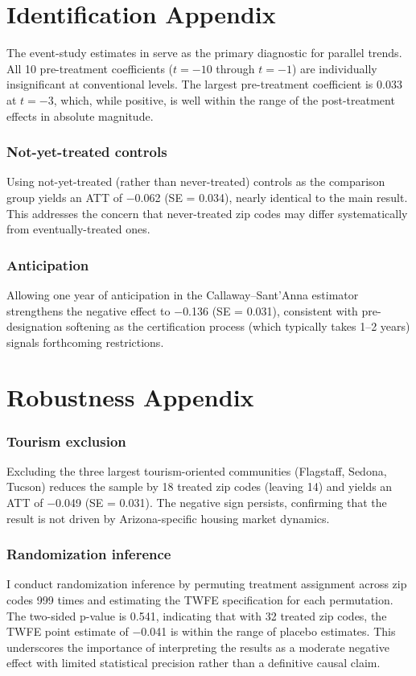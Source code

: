 \documentclass[12pt]{article}
\begin{document}
\section{Identification Appendix}

The event-study estimates in  serve as the primary diagnostic for parallel trends. All 10 pre-treatment coefficients ($t = -10$ through $t = -1$) are individually insignificant at conventional levels. The largest pre-treatment coefficient is 0.033 at $t = -3$, which, while positive, is well within the range of the post-treatment effects in absolute magnitude.

\subsubsection*{Not-yet-treated controls} Using not-yet-treated (rather than never-treated) controls as the comparison group yields an ATT of $-$0.062 (SE = 0.034), nearly identical to the main result. This addresses the concern that never-treated zip codes may differ systematically from eventually-treated ones.

\subsubsection*{Anticipation} Allowing one year of anticipation in the Callaway--Sant'Anna estimator strengthens the negative effect to $-$0.136 (SE = 0.031), consistent with pre-designation softening as the certification process (which typically takes 1--2 years) signals forthcoming restrictions.

\section{Robustness Appendix}

\subsubsection*{Tourism exclusion} Excluding the three largest tourism-oriented communities (Flagstaff, Sedona, Tucson) reduces the sample by 18 treated zip codes (leaving 14) and yields an ATT of $-$0.049 (SE = 0.031). The negative sign persists, confirming that the result is not driven by Arizona-specific housing market dynamics.

\subsubsection*{Randomization inference} I conduct randomization inference by permuting treatment assignment across zip codes 999 times and estimating the TWFE specification for each permutation. The two-sided p-value is 0.541, indicating that with 32 treated zip codes, the TWFE point estimate of $-$0.041 is within the range of placebo estimates. This underscores the importance of interpreting the results as a moderate negative effect with limited statistical precision rather than a definitive causal claim.
\end{document}
